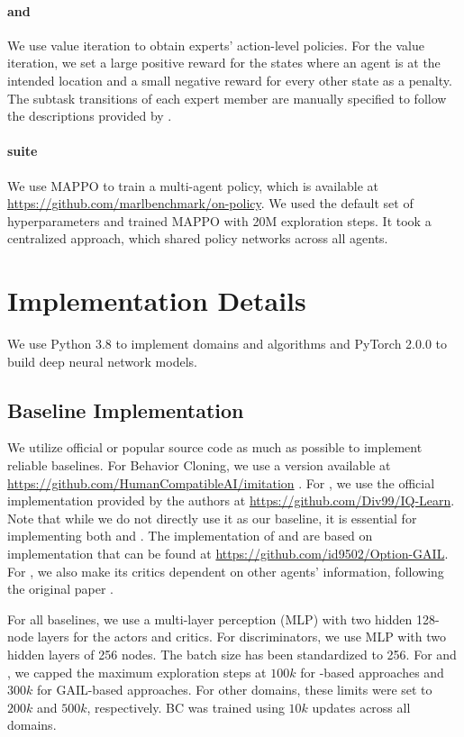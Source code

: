 \paragraph{\movers and \rescue} We use value iteration to obtain experts' action-level policies. For the value iteration, we set a large positive reward for the states where an agent is at the intended location and a small negative reward for every other state as a penalty. The subtask transitions of each expert member are manually specified to follow the descriptions provided by \cite{seo2023automated}.

\paragraph{\smactwo suite} We use MAPPO \cite{yu2022the} to train a multi-agent policy, which is available at \url{https://github.com/marlbenchmark/on-policy}. We used the default set of hyperparameters and trained MAPPO with 20M exploration steps. It took a centralized approach, which shared policy networks across all agents.

\section{Implementation Details}
We use Python 3.8 to implement domains and algorithms and PyTorch 2.0.0 to build deep neural network models.

\subsection{Baseline Implementation}
We utilize official or popular source code as much as possible to implement reliable baselines. For Behavior Cloning, we use a version available at \url{https://github.com/HumanCompatibleAI/imitation} \cite{gleave2022imitation}. For \iql \cite{garg2021iq}, we use the official implementation provided by the authors at \url{https://github.com/Div99/IQ-Learn}. Note that while we do not directly use it as our baseline, it is essential for implementing both \iiqlsh and \ouralg. The implementation of \magail and \maogail are based on \ogail implementation that can be found at \url{https://github.com/id9502/Option-GAIL}. For \magail, we also make its critics dependent on other agents' information, following the original paper \cite{song2018multi}. 

For all baselines, we use a multi-layer perception (MLP) with two hidden 128-node layers for the actors and critics. For discriminators, we use MLP with two hidden layers of 256 nodes. The batch size has been standardized to 256.
For \movers and \rescue, we capped the maximum exploration steps at $100k$ for \iql-based approaches and $300k$ for GAIL-based approaches. For other domains, these limits were set to $200k$ and $500k$, respectively. BC was trained using $10k$ updates across all domains.


